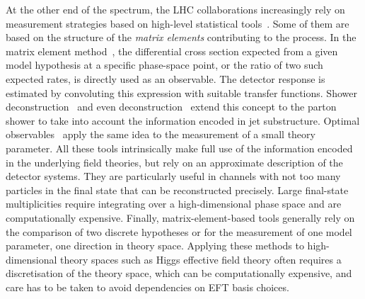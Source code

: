 At the other end of the spectrum, the LHC collaborations increasingly
rely on measurement strategies based on high-level statistical
tools~\cite{cranmer:nips2016}. Some of them are based on the structure
of the \emph{matrix elements} contributing to the process. In the
matrix element method~\cite{Kondo:1988yd, Abazov:2004cs, Gao:2010qx,
  Alwall:2010cq, Avery:2012um, Andersen:2012kn, Campbell:2013hz,
  Artoisenet:2013vfa, Martini:2015fsa, Gritsan:2016hjl}, the
differential cross section expected from a given model hypothesis at a
specific phase-space point, or the ratio of two such expected rates,
is directly used as an observable. The detector response is estimated
by convoluting this expression with suitable transfer
functions. Shower deconstruction~\cite{Soper:2011cr, Soper:2012pb} and
even deconstruction~\cite{Soper:2014rya} extend this concept to the
parton shower to take into account the information encoded in jet
substructure. Optimal observables~\cite{Atwood:1991ka, Davier:1992nw,
  Diehl:1993br} apply the same idea to the measurement of a small
theory parameter. All these tools intrinsically make full use of the
information encoded in the underlying field theories, but rely on an
approximate description of the detector systems. They are particularly
useful in channels with not too many particles in the final state that
can be reconstructed precisely. Large final-state multiplicities
require integrating over a high-dimensional phase space and are
computationally expensive. Finally, matrix-element-based tools
generally rely on the comparison of two discrete hypotheses or for the
measurement of one model parameter, \ie one direction in theory
space. Applying these methods to high-dimensional theory spaces such
as Higgs effective field theory often requires a discretisation of the
theory space, which can be computationally expensive, and care has to
be taken to avoid dependencies on EFT basis choices.

